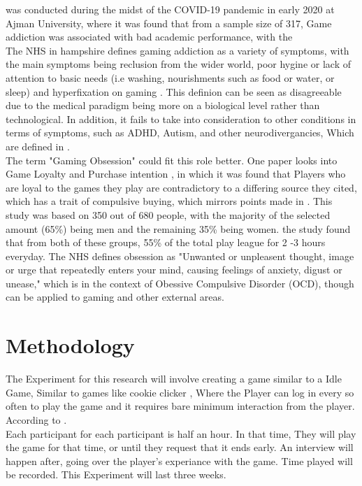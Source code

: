 \documentclass[conference]{IEEEtran}
\begin{document}
\cite{Naaj2021} was conducted during the midst of the COVID-19 pandemic in early 2020 at Ajman University, where it was found that from a sample size of 317, Game addiction was associated with bad academic performance, with the \\

The NHS in hampshire defines gaming addiction as a variety of symptoms, with the main symptoms being reclusion from the wider world, poor hygine or lack of attention to basic needs (i.e washing, nourishments such as food or water, or sleep) and hyperfixation on gaming \cite{NHSHamp24}. This definion can be seen as disagreeable due to the medical paradigm being more on a biological level rather than technological. In addition, it fails to take into consideration to other conditions in terms of symptoms, such as ADHD, Autism, and other neurodivergancies, Which are defined in \cite{Association2022}.\\

The term "Gaming Obsession" could fit this role better. One paper looks into Game Loyalty and Purchase intention \cite{Ramli2022}, in which it was found that Players who are loyal to the games they play are contradictory to a differing source they cited\cite{Widodo2020}, which has a trait of compulsive buying, which mirrors points made in \cite {yasir2021}.  This study was based on 350 out of 680 people, with the majority of the selected amount (65\%) being men and the remaining 35\% being women. the study found that from both of these groups, 55\% of the total play league for 2 -3 hours everyday. The NHS  \cite{NHS2021} defines obsession as "Unwanted or unpleasent thought, image or urge that repeatedly enters your mind, causing feelings of anxiety, digust or unease," which is in the context of Obessive Compulsive Disorder (OCD), though can be applied to gaming and other external areas.\\

\section{Methodology}
The Experiment for this research will involve creating a game similar to a Idle Game, Similar to games like cookie clicker \cite{CookieSteam21}, Where the Player can log in every so often to play the game and it requires bare minimum interaction from the player. According to \cite{Hwang2024}.\\

Each participant for each participant  is half an hour. In that time, They will play the game for that time, or until they request that it ends early. An interview will happen after, going over the player's experiance with the game. Time played will be recorded. This Experiment will last three weeks.\\
\end{document}
